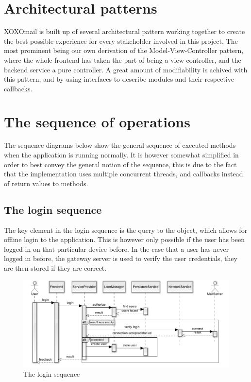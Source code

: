 \section{Architectural patterns}
	XOXOmail is built up of several architectural pattern working together to create the best possible experience for every stakeholder involved in this project. The most prominent being our own derivation of the Model-View-Controller pattern, where the whole frontend has taken the part of being a view-controller, and the backend service a pure controller. A great amount of modifiability is achived with this pattern, and by using interfaces to describe modules and their respective callbacks. 
	
\newpage

\section{The sequence of operations}
	The sequence diagrams below show the general sequence of executed methods when the application is running normally. It is however somewhat simplified in order to best convey the general notion of the sequence, this is due to the fact that the implementation uses multiple concurrent threads, and callbacks instead of return values to methods. 
	\subsection{The login sequence}
	The key element in the login sequence is the query to the  object, which allows for offline login to the application. This is however only possible if the user has been logged in on that particular device before. In the case that a user has never logged in before, the gateway server is used to verify the user credentials, they are then stored if they are correct. 
	\begin{figure}[H]
		\includegraphics[width=\textwidth]{LoginSequence}
		\caption{The login sequence}
		\label{fig:lifecycle}
	\end{figure}

